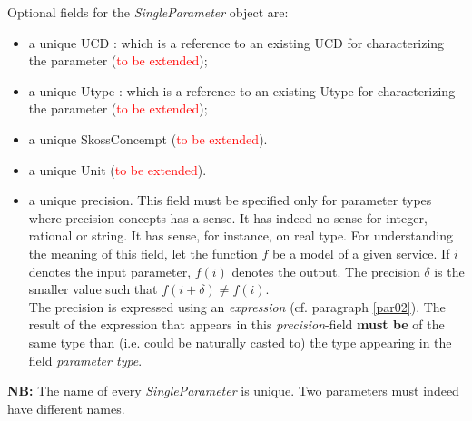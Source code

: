 \documentclass[a4paper,11pt] {article}
\begin{document}
Optional fields for the {\it SingleParameter} object are:
\begin{itemize}
\item a unique UCD : which is a reference to an existing UCD for characterizing the parameter (\textcolor{red}{to be extended});
\item a unique Utype  : which is a reference to an existing Utype for characterizing the parameter (\textcolor{red}{to be extended});
\item a unique SkossConcempt (\textcolor{red}{to be extended}).
\item a unique Unit (\textcolor{red}{to be extended}).
\item a unique precision. This field must be specified only for parameter types where precision-concepts has a sense. It has indeed no sense for integer, rational or string. It has sense, for instance, on real type. For understanding the meaning of this field, let the function $f$ be a model of a given service. If $i$ denotes the input parameter, $f(i)$ denotes the output. The precision $\delta$ is the smaller value such that $f(i+\delta) \neq f(i)$.\\ The precision is expressed using an {\it expression} (cf. paragraph \ref{par02}). The result of the expression that appears in this {\it precision}-field  {\bf must be} of the same type than (i.e. could be naturally casted to) the type appearing in the field {\it parameter type}.
\end{itemize}

{\bf NB:} The name of every {\it SingleParameter} is unique. Two parameters must indeed have different names. 
\end{document}
